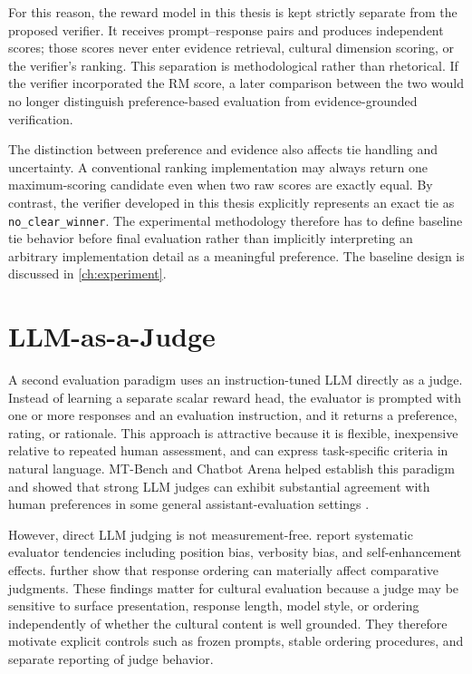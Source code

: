For this reason, the reward model in this thesis is kept strictly separate from the proposed verifier. It receives prompt--response pairs and produces independent scores; those scores never enter evidence retrieval, cultural dimension scoring, or the verifier's ranking. This separation is methodological rather than rhetorical. If the verifier incorporated the RM score, a later comparison between the two would no longer distinguish preference-based evaluation from evidence-grounded verification.

The distinction between preference and evidence also affects tie handling and uncertainty. A conventional ranking implementation may always return one maximum-scoring candidate even when two raw scores are exactly equal. By contrast, the verifier developed in this thesis explicitly represents an exact tie as \texttt{no\_clear\_winner}. The experimental methodology therefore has to define baseline tie behavior before final evaluation rather than implicitly interpreting an arbitrary implementation detail as a meaningful preference. The baseline design is discussed in \cref{ch:experiment}.

\section{LLM-as-a-Judge}
\label{sec:background-judge}

A second evaluation paradigm uses an instruction-tuned LLM directly as a judge. Instead of learning a separate scalar reward head, the evaluator is prompted with one or more responses and an evaluation instruction, and it returns a preference, rating, or rationale. This approach is attractive because it is flexible, inexpensive relative to repeated human assessment, and can express task-specific criteria in natural language. MT-Bench and Chatbot Arena helped establish this paradigm and showed that strong LLM judges can exhibit substantial agreement with human preferences in some general assistant-evaluation settings \parencite{zheng2023llmjudge}.

However, direct LLM judging is not measurement-free. \textcite{zheng2023llmjudge} report systematic evaluator tendencies including position bias, verbosity bias, and self-enhancement effects. \textcite{wang2024notfairevaluators} further show that response ordering can materially affect comparative judgments. These findings matter for cultural evaluation because a judge may be sensitive to surface presentation, response length, model style, or ordering independently of whether the cultural content is well grounded. They therefore motivate explicit controls such as frozen prompts, stable ordering procedures, and separate reporting of judge behavior.

